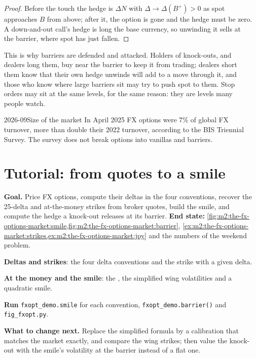 \begin{proof}
Before the touch the hedge is $\Delta N$ with $\Delta \to \Delta(B^+) > 0$ as spot
approaches $B$ from above; after it, the option is gone and the hedge must be zero.
A down-and-out call's hedge is long the base currency, so unwinding it sells at
the barrier, where spot has just fallen.
\end{proof}

This is why barriers are defended and attacked. Holders of knock-outs, and dealers
long them, buy near the barrier to keep it from trading; dealers short them know
that their own hedge unwinds will add to a move through it, and those who know
where large barriers sit may try to push spot to them. Stop orders may sit at the
same levels, for the same reason: they are levels many people watch.

\begin{dated}{2026-09}{Size of the market}\label{dat:m2:the-fx-options-market:size}
In April 2025 FX options were 7\% of global FX turnover, more than double their
2022 turnover, according to the BIS Triennial Survey. The survey does not break
options into vanillas and barriers.
\end{dated}

\section{Tutorial: from quotes to a smile}\label{tut:m2:the-fx-options-market:smile}

\begin{tutorial}
\textbf{Goal.} Price FX options, compute their deltas in the four conventions,
recover the 25-delta and at-the-money strikes from broker quotes, build the smile,
and compute the hedge a knock-out releases at its barrier. \textbf{End state:}
\cref{fig:m2:the-fx-options-market:smile,fig:m2:the-fx-options-market:barrier},
\cref{ex:m2:the-fx-options-market:strikes,ex:m2:the-fx-options-market:jpy} and the
numbers of the weekend problem.
\begin{tutsteps}
\item \textbf{Deltas and strikes}: the four delta conventions and the strike with
a given delta.
\label{lst:m2:the-fx-options-market:delta}
\item \textbf{At the money and the smile}: the , the
simplified wing volatilities and a quadratic smile.
\label{lst:m2:the-fx-options-market:smile}
\item \textbf{Run} \texttt{fxopt\_demo.smile} for each convention,
\texttt{fxopt\_demo.barrier()} and \texttt{fig\_fxopt.py}.
\end{tutsteps}
\textbf{What to change next.} Replace the simplified formula by a calibration that
matches the market  exactly, and compare the wing strikes; then value the
knock-out with the smile's volatility at the barrier instead of a flat one.
\end{tutorial}

